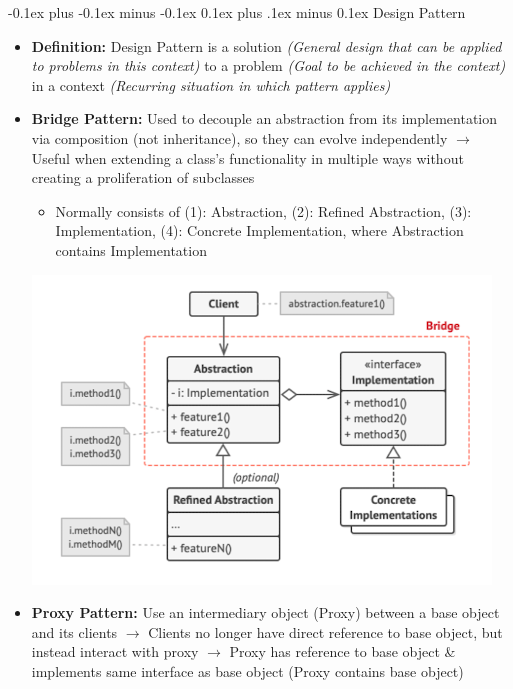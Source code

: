 \documentclass[landscape]{article}
\makeatletter
\renewcommand{\subsection}{\@startsection{subsection}{2}{0mm}%
  {-0.1ex plus -0.1ex minus -0.1ex}%
  {0.1ex plus .1ex minus 0.1ex}%
{\normalfont\scriptsize\bfseries}}
\makeatother
\begin{document}
\begin{multicols*}{5}
    \subsection{Design Pattern}
    \begin{itemize}
      \item \textbf{Definition:} Design Pattern is a solution \textit{(General design that can be applied to problems in this context)} to a problem \textit{(Goal to be achieved in the context)} in a context \textit{(Recurring situation in which pattern applies)}
      \item \textbf{Bridge Pattern:} Used to decouple an abstraction from its implementation via composition (not inheritance), so they can evolve independently $\rightarrow$ Useful when extending a class's functionality in multiple ways without creating a proliferation of subclasses
      \begin{itemize}
        \item Normally consists of (1): Abstraction, (2): Refined Abstraction, (3): Implementation, (4): Concrete Implementation, where Abstraction contains Implementation
      \end{itemize}
      \includegraphics[width=0.75\linewidth]{11_bridge_pattern.png}
      \item \textbf{Proxy Pattern:} Use an intermediary object (Proxy) between a base object and its clients $\rightarrow$ Clients no longer have direct reference to base object, but instead interact with proxy $\rightarrow$ Proxy has reference to base object \& implements same interface as base object (Proxy contains base object)
    \end{itemize}
    

\end{multicols*}
\end{document}
